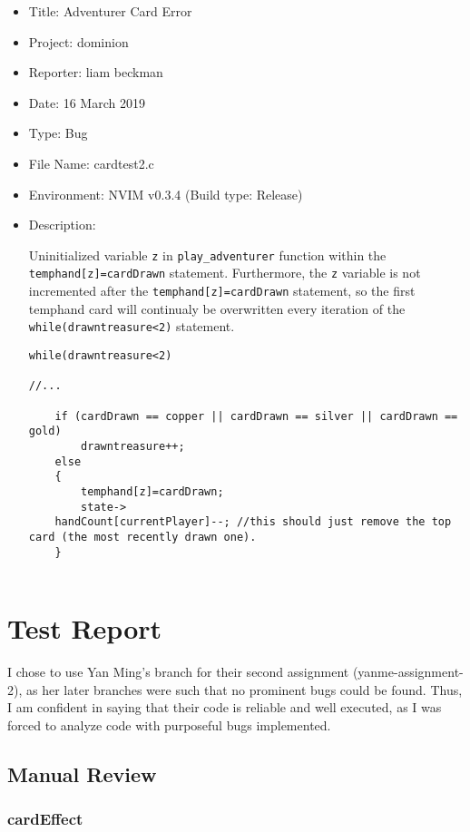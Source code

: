 \documentclass[11pt]{article}
\begin{document}
\begin{itemize}
\item Title: Adventurer Card Error
\item Project: dominion
\item Reporter: liam beckman
\item Date: 16 March 2019
\item Type: Bug
\item File Name: cardtest2.c
\item Environment: NVIM v0.3.4 (Build type: Release)
\item Description:

Uninitialized variable \texttt{z} in \texttt{play\_adventurer} function within the \texttt{temphand[z]=cardDrawn} statement. Furthermore, the \texttt{z} variable is not incremented after the \texttt{temphand[z]=cardDrawn} statement, so the first temphand card will continualy be overwritten every iteration of the \texttt{while(drawntreasure<2)} statement.

\begin{verbatim}
while(drawntreasure<2)

//...

    if (cardDrawn == copper || cardDrawn == silver || cardDrawn == gold)
        drawntreasure++;
    else
    {
        temphand[z]=cardDrawn;
        state->
    handCount[currentPlayer]--; //this should just remove the top card (the most recently drawn one).
    }


\end{verbatim}
\end{itemize}

\section{Test Report}
\label{sec:testreport}

I chose to use Yan Ming's branch for their second assignment (yanme-assignment-2), as her later branches were such that no prominent bugs could be found. Thus, I am confident in saying that their code is reliable and well executed, as I was forced to analyze code with purposeful bugs implemented.

\subsection{Manual Review}
\label{sec:manualreview}
\subsubsection{cardEffect}
\label{sec:cardeffect}
\end{document}
